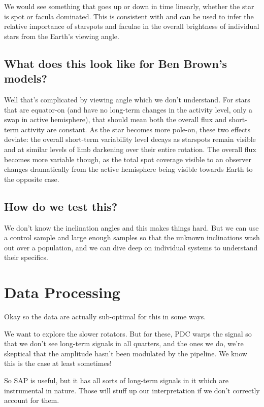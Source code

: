 \documentclass[twocolumn,dvipsnames]{aastex631}
\begin{document}
We would see something that goes up or down in time linearly, whether the star is spot or facula dominated. This is consistent with \citet{Montet17} and can be used to infer the relative importance of starspots and faculae in the overall brightness of individual stars from the Earth's viewing angle.

\subsection{What does this look like for Ben Brown's models?}

Well that's complicated by viewing angle which we don't understand. For stars that are equator-on (and have no long-term changes in the activity level, only a swap in active hemisphere), that should mean both the overall flux and short-term activity are constant. As the star becomes more pole-on, these two effects deviate: the overall short-term variability level decays as starspots remain visible and at similar levels of limb darkening over their entire rotation. The overall flux becomes more variable though, as the total spot coverage visible to an observer changes dramatically from the active hemisphere being visible towards Earth to the opposite case. 

\subsection{How do we test this?}

We don't know the inclination angles and this makes things hard. But we can use a control sample and large enough samples so that the unknown inclinations wash out over a population, and we can dive deep on individual systems to understand their specifics. 


\section{Data Processing}

Okay so the data are actually sub-optimal for this in some ways.

We want to explore the slower rotators. But for these, PDC warps the signal so that we don't see long-term signals in all quarters, and the ones we do, we're skeptical that the amplitude hasn't been modulated by the pipeline. We know this is the case at least sometimes!

So SAP is useful, but it has all sorts of long-term signals in it which are instrumental in nature. Those will stuff up our interpretation if we don't correctly account for them.
\end{document}
